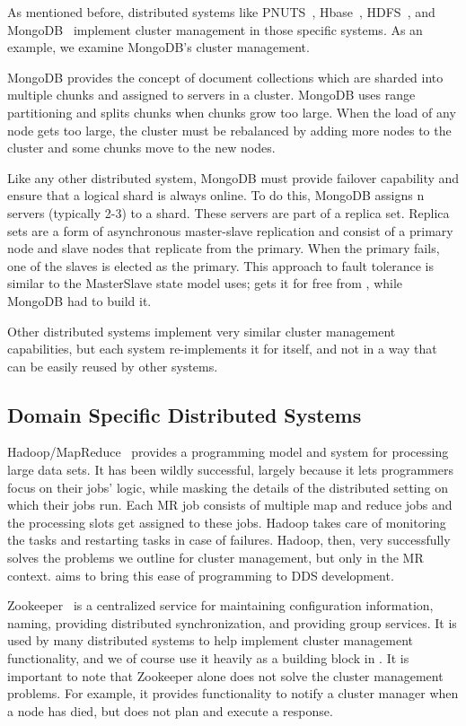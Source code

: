As mentioned before, distributed systems like PNUTS~\cite{cooper08},
Hbase~\cite{hbase}, HDFS~\cite{hadoop}, and MongoDB~\cite{mongodb} implement 
cluster management in those specific systems. As an example, we examine
MongoDB's cluster management. 

MongoDB provides the concept of document collections which are sharded into
multiple chunks and assigned to servers in a cluster. MongoDB uses range
partitioning and splits chunks when chunks grow too large. When the load of any
node gets too large, the cluster must be rebalanced by adding more nodes to the
cluster and some chunks move to the new nodes.

Like any other distributed system, MongoDB must provide failover capability and
ensure that a logical shard is always online. To do this, MongoDB assigns n
servers (typically 2-3) to a shard. These servers are part of a replica set.
Replica sets are a form of asynchronous master-slave replication and consist of
a primary node and slave nodes that replicate from the primary. When the primary
fails, one of the slaves is elected as the primary.  This approach to fault
tolerance is similar to the MasterSlave state model \ES uses; \ES gets it for
free from \helix, while MongoDB had to build it.

Other distributed systems implement very similar cluster management
capabilities, but each system re-implements it for itself, and not in a way that
can be easily reused by other systems. 

\subsection{Domain Specific Distributed Systems}

Hadoop/MapReduce~\cite{hadoop,dean04} provides a programming model and
system for 
processing large data sets. It has been wildly successful, largely because it
lets programmers focus on their jobs' logic, while masking the details of the
distributed setting on which their jobs run.  Each MR job consists of multiple map and reduce jobs 
and the processing slots get assigned to these jobs. Hadoop takes care of monitoring 
the tasks and restarting tasks in case of failures.  Hadoop, then, very
successfully solves the problems we outline for cluster management, but only in
the MR context.  \helix aims to bring this ease of programming to DDS
development.

Zookeeper~\cite{zookeeper} is a centralized service for maintaining configuration information, 
naming, providing distributed synchronization, and providing group services. 
It is used by many distributed systems to help implement cluster management
functionality, and we of course use it heavily as a building block in \helix.  It is important to
note that Zookeeper alone does not solve the cluster management problems.  For
example, it provides functionality to notify a cluster manager when a node has
died, but does not plan and execute a response. 

